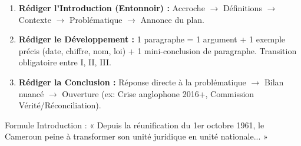 \documentclass[11pt]{article}
\newcommand{\cle}[1]{{\popxbold\color{popdark}#1}}
\begin{document}
\begin{methode}
\begin{enumerate}
\begin{itemize}
        \end{itemize}
    \item \textbf{Rédiger l'Introduction (Entonnoir) :} Accroche $\rightarrow$ Définitions $\rightarrow$ Contexte $\rightarrow$ Problématique $\rightarrow$ Annonce du plan.
    \item \textbf{Rédiger le Développement :} 1 paragraphe = 1 argument + 1 exemple précis (date, chiffre, nom, loi) + 1 mini-conclusion de paragraphe. \cle{Transition} obligatoire entre I, II, III.
    \item \textbf{Rédiger la Conclusion :} Réponse directe à la problématique $\rightarrow$ Bilan nuancé $\rightarrow$ Ouverture (ex: Crise anglophone 2016+, Commission Vérité/Réconciliation).
\end{enumerate}
\cle{Formule Introduction :} « Depuis la réunification du 1er octobre 1961, le Cameroun peine à transformer son unité juridique en unité nationale... »
\end{methode}
\end{document}
